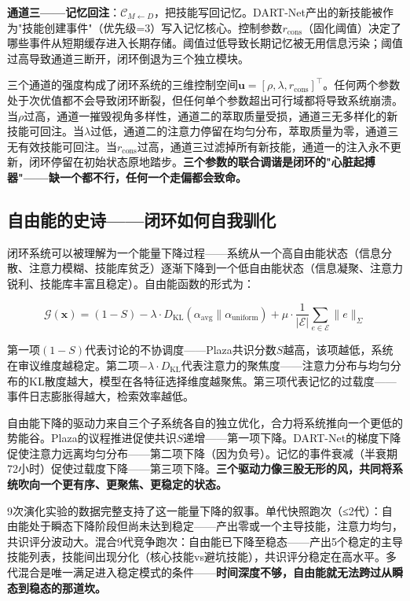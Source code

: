 \documentclass[twocolumn,10.5pt]{ctexart}
\def\cC{\mathcal{C}}
\def\cE{\mathcal{E}}
\def\cG{\mathcal{G}}
\begin{document}
\textbf{通道三——记忆回注}：$\cC_{M \leftarrow D}$，把技能写回记忆。DART-Net产出的新技能被作为"技能创建事件"（优先级=3）写入记忆核心。控制参数$r_{\text{cons}}$（固化阈值）决定了哪些事件从短期缓存进入长期存储。阈值过低导致长期记忆被无用信息污染；阈值过高导致通道三断开，闭环倒退为三个独立模块。

三个通道的强度构成了闭环系统的三维控制空间$\mathbf{u} = [\rho, \lambda, r_{\text{cons}}]^\top$。任何两个参数处于次优值都不会导致闭环断裂，但任何单个参数超出可行域都将导致系统崩溃。当$\rho$过高，通道一摧毁视角多样性，通道二的萃取质量受损，通道三无多样化的新技能可回注。当$\lambda$过低，通道二的注意力停留在均匀分布，萃取质量为零，通道三无有效技能可回注。当$r_{\text{cons}}$过高，通道三过滤掉所有新技能，通道一的注入永不更新，闭环停留在初始状态原地踏步。\textbf{三个参数的联合调谐是闭环的"心脏起搏器"——缺一个都不行，任何一个走偏都会致命。}

\subsection{自由能的史诗——闭环如何自我驯化}

闭环系统可以被理解为一个能量下降过程——系统从一个高自由能状态（信息分散、注意力模糊、技能库贫乏）逐渐下降到一个低自由能状态（信息凝聚、注意力锐利、技能库丰富且稳定）。自由能函数的形式为：

\begin{equation}
\cG(\mathbf{x}) = (1 - S) - \lambda \cdot D_{\text{KL}}(\alpha_{\text{avg}} \parallel \alpha_{\text{uniform}}) + \mu \cdot \frac{1}{|\cE|}\sum_{e\in \cE} \|e\|_\Sigma
\label{eq:free_energy_passionate}
\end{equation}

第一项$(1-S)$代表讨论的不协调度——Plaza共识分数$S$越高，该项越低，系统在审议维度越稳定。第二项$-\lambda \cdot D_{\text{KL}}$代表注意力的聚焦度——注意力分布与均匀分布的KL散度越大，模型在各特征选择维度越聚焦。第三项代表记忆的过载度——事件日志膨胀得越大，检索效率越低。

自由能下降的驱动力来自三个子系统各自的独立优化，合力将系统推向一个更低的势能谷。Plaza的议程推进促使共识$S$递增——第一项下降。DART-Net的梯度下降促使注意力远离均匀分布——第二项下降（因为负号）。记忆的事件衰减（半衰期72小时）促使过载度下降——第三项下降。\textbf{三个驱动力像三股无形的风，共同将系统吹向一个更有序、更聚焦、更稳定的状态。}

9次演化实验的数据完整支持了这一能量下降的叙事。单代快照跑次（≤2代）：自由能处于瞬态下降阶段但尚未达到稳定——产出零或一个主导技能，注意力均匀，共识评分波动大。混合9代竞争跑次：自由能已下降至稳态——产出5个稳定的主导技能列表，技能间出现分化（核心技能vs避坑技能），共识评分稳定在高水平。多代混合是唯一满足进入稳定模式的条件——\textbf{时间深度不够，自由能就无法跨过从瞬态到稳态的那道坎。}
\end{document}
